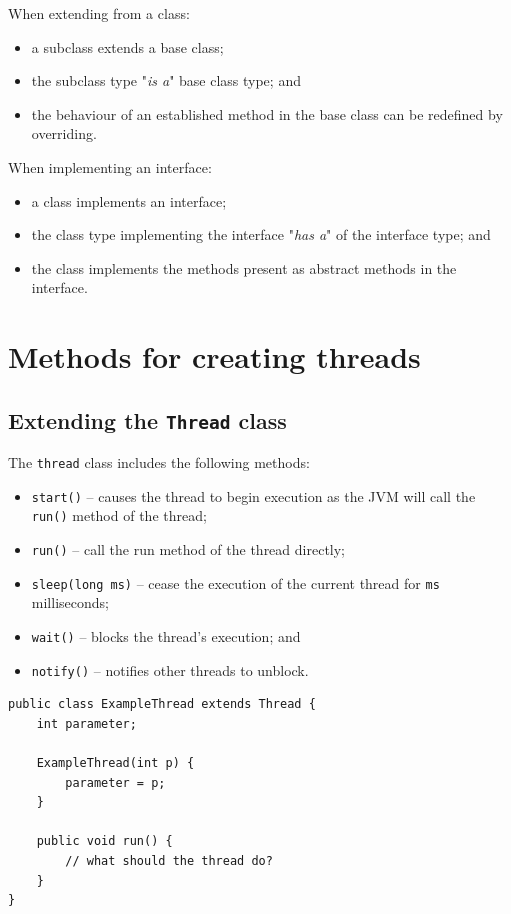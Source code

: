 \documentclass[a4paper]{systems-software}
\begin{document}
When extending from a class:
\begin{itemize}
	\item a subclass extends a base class;
	\item the subclass type "\textit{is a}" base class type; and
	\item the behaviour of an established method in the base class can be redefined by overriding.
\end{itemize}

When implementing an interface:
\begin{itemize}
	\item a class implements an interface;
	\item the class type implementing the interface "\textit{has a}" of the interface type; and
	\item the class implements the methods present as abstract methods in the interface.
\end{itemize}


\section*{Methods for creating threads}

\subsection*{Extending the \texttt{Thread} class}

The \texttt{thread} class includes the following methods:
\begin{itemize}
	\item \texttt{start()} -- causes the thread to begin execution as the JVM will call the \texttt{run()} method of the thread;
	\item \texttt{run()} -- call the run method of the thread directly;
	\item \texttt{sleep(long ms)} -- cease the execution of the current thread for \texttt{ms} milliseconds;
	\item \texttt{wait()} -- blocks the thread's execution; and
	\item \texttt{notify()} -- notifies other threads to unblock.
\end{itemize}

\begin{lstlisting}[title={ExampleThread class extending the Thread class.}]
public class ExampleThread extends Thread {
	int parameter;
	
	ExampleThread(int p) {
		parameter = p;
	}
	
	public void run() {
		// what should the thread do?
	}
}
\end{lstlisting}
\end{document}
